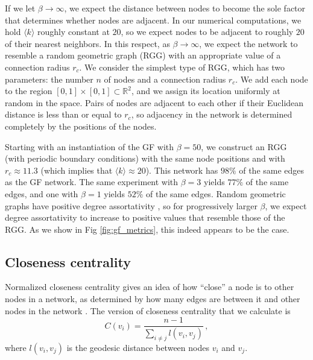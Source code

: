 \documentclass[%
 reprint,
 amsmath,amssymb,
 aps,
]{revtex4-1}
\begin{document}
If we let $\beta \rightarrow \infty$, we expect the distance between nodes to become the sole factor that determines whether nodes are adjacent. In our numerical computations, we hold $\langle k \rangle$ roughly constant at $20$, so we expect nodes to be adjacent to roughly $20$ of their nearest neighbors. In this respect, as $\beta \rightarrow \infty$, we expect the network to resemble a random geometric graph (RGG) \cite{penrose-rgg, rgg} with an appropriate value of a connection radius $r_c$. We consider the simplest type of RGG, which has two parameters: the number $n$ of nodes and a connection radius $r_c$. We add each node to the region $[0, 1] \times [0, 1] \subset \mathbb{R}^2$, and we assign its location uniformly at random in the space. Pairs of nodes are adjacent to each other if their Euclidean distance is less than or equal to $r_c$, so adjacency in the network is determined completely by the positions of the nodes. 


Starting with an instantiation of the GF with $\beta=50$, we construct an RGG (with periodic boundary conditions) with the same node positions and with $r_c \approx 11.3$ (which implies that $\langle k \rangle \approx 20$). This network has $98\%$ of the same edges as the GF network. The same experiment with $\beta=3$ yields $77\%$ of the same edges, and one with $\beta=1$ yields $52\%$ of the same edges.
 Random geometric graphs have positive degree assortativity \cite{rgg_correlations}, so for progressively larger $\beta$, we expect degree assortativity to increase to positive values that resemble those of the RGG.
 As we show in Fig \ref{fig:gf_metrics}, this indeed appears to be the case.



\subsection{Closeness centrality}\label{close}

Normalized closeness centrality gives an idea of how ``close'' a node is to other nodes in a network, as determined by how many edges are between it and other nodes in the network \cite{newman2018}. The version of closeness centrality that we calculate is
\begin{equation}
    C(v_i) = \frac{n - 1}{\sum\limits_{i \neq j} l(v_i,v_j)}\,,
\end{equation}
where $l(v_i, v_j)$ is the geodesic distance between nodes $v_i$ and $v_j$.
\end{document}
